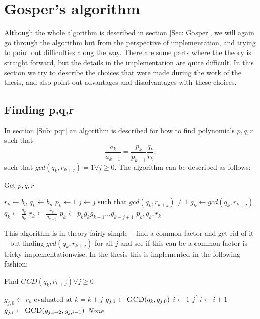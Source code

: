 \section{Gosper's algorithm}
Although the whole algorithm is described in section \ref{Sec: Gosper}, we will again go through the algorithm but from the perspective of implementation, and trying to point out difficulties along the way. There are some parts where the theory is straight forward, but the details in the implementation are quite difficult. In this section we try to describe the choices that were made during the work of the thesis, and also point out advantages and disadvantages with these choices.
\subsection{Finding p,q,r}\label{Sub: findpqr}
In section \ref{Sub: pqr} an algorithm is described for how to find polynomials $p,q,r$ such that
\begin{equation}\label{Eq: getpqr}
  \frac{a_k}{a_{k-1}} = \frac{p_k}{p_{k-1}}\frac{q_k}{r_k},
\end{equation}
such that $gcd(q_k,r_{k+j})=1 \forall j\geq 0$. The algorithm can be described as follows:
\begin{algorithm}[H]
  \caption{Get $p,q,r$}
  \begin{algorithmic}[1]
      \State $r_k\gets b_d$
      \State $q_k\gets b_n$
      \State $p_k\gets 1$
        \State $j\gets j \text{ such that } gcd(q_k,r_{k+j})\neq 1$
        \State $g_k\gets gcd(q_k,r_{k+j})$
        \State $q_k\gets \frac{q_k}{g_k}$
        \State $r_k\gets \frac{r_k}{g_{k-j}}$
        \State $p_k\gets p_kg_kg_{k-1}\ldots g_{k-j+1}$
      \EndWhile
      \State \Return $p_k,q_k,r_k$
    \EndProcedure
  \end{algorithmic}
\end{algorithm}
This algorithm is in theory fairly simple -- find a common factor and get rid of it -- but finding $gcd(q_k,r_{k+j})$ for all $j$ and see if this can be a common factor is tricky implementationwise. In the thesis this is implemented in the following fashion:
\begin{algorithm}[H]
  \caption{Find $GCD(q_k,r_{k+j})\forall j\geq 0$}
  \begin{algorithmic}[1]
      \State $g_{j,0}\gets r_k \text{ evaluated at } k=k+j$
      \State $g_{j,1}\gets \Call{GCD}{q_k,g_{j,0}}$
      \State $i\gets 1$
        \label{Alg: GCDWithShift,if}
          \State \Return $j^\prime$
        \EndIf
        \State $i\gets i+1$
        \State $g_{j,i}\gets \Call{GCD}{g_{j,i-2},g_{j,i-1}}$
      \EndWhile
      \State \Return $None$
    \EndProcedure
  \end{algorithmic}
\end{algorithm}

